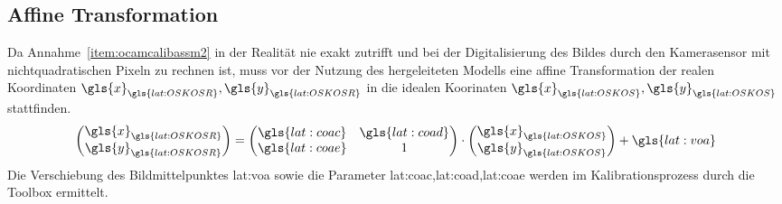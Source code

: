 \subsection{Affine Transformation}
Da Annahme~\ref{item:ocamcalibassm2} in der Realität nie exakt zutrifft und bei der Digitalisierung des Bildes durch den Kamerasensor mit nichtquadratischen Pixeln zu rechnen ist, muss vor der Nutzung des hergeleiteten Modells eine affine Transformation der realen Koordinaten \(\gls{x}_{\gls{lat:OSKOSR}}, \gls{y}_{\gls{lat:OSKOSR}}\) in die idealen Koorinaten \(\gls{x}_{\gls{lat:OSKOS}}, \gls{y}_{\gls{lat:OSKOS}}\) stattfinden.
\begin{equation}
\begin{pmatrix}
\gls{x}_{\gls{lat:OSKOSR}} \\ \gls{y}_{\gls{lat:OSKOSR}}
\end{pmatrix}
=
\begin{pmatrix}
\gls{lat:coac} & \gls{lat:coad} \\
\gls{lat:coae} & 1 
\end{pmatrix}
\cdot
\begin{pmatrix}
\gls{x}_{\gls{lat:OSKOS}} \\ \gls{y}_{\gls{lat:OSKOS}}
\end{pmatrix}
+
\gls{lat:voa}
\end{equation}
 Die Verschiebung des Bildmittelpunktes \gls{lat:voa} sowie die Parameter \gls{lat:coac},\gls{lat:coad},\gls{lat:coae} werden im Kalibrationsprozess durch die Toolbox ermittelt.


